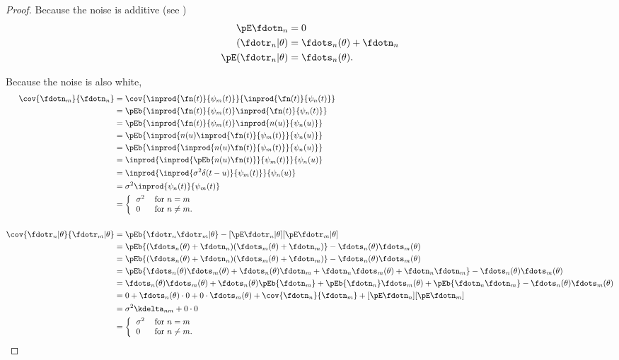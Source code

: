 \begin{proof}
Because the noise is additive (see )
\begin{align*}
   \pE\fdotn_{n}           &= 0  \\
   (\fdotr_n |\theta)      &= \fdots_n(\theta)  + \fdotn_n \\
   \pE({\fdotr_n} | \theta) &= \fdots_n(\theta).
\end{align*}

Because the noise is also white,
\begin{align*}
   \cov{\fdotn_m}{\fdotn_n}
      &= \cov{\inprod{\fn(t)}{\psi_m(t)}}{\inprod{\fn(t)}{\psi_n(t)}}
    \\&= \pEb{\inprod{\fn(t)}{\psi_m(t)} \inprod{\fn(t)}{\psi_n(t)}}
    \\&= \pEb{\inprod{\fn(t)}{\psi_m(t)} \inprod{n(u)}{\psi_n(u)}}
    \\&= \pEb{ \inprod{n(u)\inprod{\fn(t)}{\psi_m(t)}}{\psi_n(u)}}
    \\&= \pEb{ \inprod{\inprod{n(u)\fn(t)}{\psi_m(t)}}{\psi_n(u)}}
    \\&= \inprod{\inprod{\pEb{ n(u)\fn(t)}}{\psi_m(t)}}{\psi_n(u)}
    \\&= \inprod{\inprod{\sigma^2 \delta(t-u)}{\psi_m(t)}}{\psi_n(u)}
    \\&= \sigma^2 \inprod{\psi_n(t)}{\psi_m(t)}
    \\&= \left\{
          \begin{tabular}{ll}
             $\sigma^2$ & for $n=m$ \\
             $0$   & for $n\ne m$.
          \end{tabular}
          \right.
\\
\\
   \cov{\fdotr_n|\theta}{\fdotr_m|\theta }
      &= \pEb{\fdotr_n \fdotr_m |\theta} - [\pE\fdotr_n|\theta][\pE\fdotr_m|\theta ]
    \\&= \pEb{(\fdots_n(\theta) +\fdotn_n)(\fdots_m(\theta) +\fdotn_m)} - \fdots_n(\theta) \fdots_m(\theta)
    \\&= \pEb{(\fdots_n(\theta) +\fdotn_n)(\fdots_m(\theta) +\fdotn_m)} - \fdots_n(\theta) \fdots_m(\theta)
    \\&= \pEb{\fdots_n(\theta) \fdots_m(\theta) +\fdots_n(\theta) \fdotn_m+ \fdotn_n\fdots_m(\theta) +\fdotn_n\fdotn_m } - \fdots_n(\theta) \fdots_m(\theta)
    \\&= \fdots_n(\theta) \fdots_m(\theta) + \fdots_n(\theta) \pEb{\fdotn_m}+ \pEb{\fdotn_n}\fdots_m(\theta) +\pEb{\fdotn_n\fdotn_m}  - \fdots_n(\theta) \fdots_m(\theta)
    \\&= 0 + \fdots_n(\theta) \cdot0 + 0\cdot\fdots_m(\theta) + \cov{\fdotn_n}{\fdotn_m}+[\pE\fdotn_n][\pE\fdotn_m]
    \\&= \sigma^2 \kdelta_{nm} + 0\cdot0
    \\&= \left\{
          \begin{tabular}{ll}
             $\sigma^2$ & for $n=m$ \\
             $0$   & for $n\ne m$.
          \end{tabular}
          \right.
\end{align*}
\end{proof}


